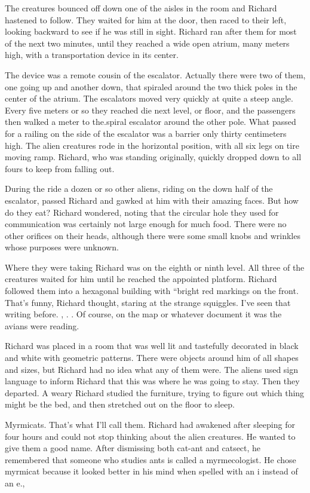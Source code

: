 \documentclass[]{article}
\begin{document}
{The creatures bounced off down one of the aisles in the room and Richard hastened to follow.  They waited for him at the door, then raced to their left, looking backward to see if he was still in sight.  Richard ran after them for most of the next two minutes, until they reached a wide open atrium, many meters high, with a transportation device in its center.

The device was a remote cousin of the escalator.  Actually there were two of them, one going up and another down, that spiraled around the two thick poles in the center of the atrium.  The escalators moved very quickly at quite a steep angle.  Every five meters or so they reached die next level, or floor, and the passengers then walked a meter to the.spiral escalator around the other pole.  What passed for a railing on the side of the escalator was a barrier only thirty centimeters high.  The alien creatures rode in the horizontal position, with all six legs on tire moving ramp.  Richard, who was standing originally, quickly dropped down to all fours to keep from falling out.

During the ride a dozen or so other aliens, riding on the down half of the escalator, passed Richard and gawked at him with their amazing faces.  But how do they eat? Richard wondered, noting that the circular hole they used for communication was certainly not large enough for much food.  There were no other orifices on their heads, although there were some small knobs and wrinkles whose purposes were unknown.

Where they were taking Richard was on the eighth or ninth level.  All three of the creatures waited for him until he reached the appointed platform.  Richard followed them into a hexagonal building with “bright red markings on the front.  That’s funny, Richard thought, staring at the strange squiggles.  I’ve seen that writing before.  , .  .  Of course, on the map or whatever document it was the avians were reading.

Richard was placed in a room that was well lit and tastefully decorated in black and white with geometric patterns.  There were objects around him of all shapes and sizes, but Richard had no idea what any of them were.  The aliens used sign language to inform Richard that this was where he was going to stay.  Then they departed.  A weary Richard studied the furniture, trying to figure out which thing might be the bed, and then stretched out on the floor to sleep.

Myrmicats.  That’s what I’ll call them.  Richard had awakened after sleeping for four hours and could not stop thinking about the alien creatures.  He wanted to give them a good name.  After dismissing both cat-ant and catsect, he remembered that someone who studies ants is called a myrmecologist.  He chose myrmicat because it looked better in his mind when spelled with an i instead of an e.,

}
\end{document}
